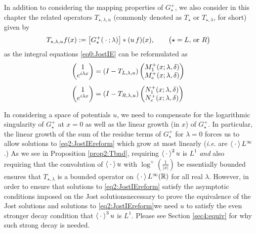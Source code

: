 \documentclass[../dissertation.tex]{subfiles}
\begin{document}
In addition to considering the mapping properties of $G_\star^+$, we also 
consider in this chapter the related operators $T_{\star, \lambda, u}$
(commonly denoted as $T_{\star}$ or $T_{\star, \lambda}$, for short) given by 
\begin{align}\label{eqn2:Tdefn}
	T_{\star, \lambda, u} f(x) 
		:= \big[ G_\star^+(\kern 0.5ex \cdot \kern 0.5ex; \lambda) \big] * (u\,f)(x),
			\qquad \big( \star = L \text{, or } R \big)
\end{align}
as the integral equations \eqref{eq0:JostIE} can be reformulated as
\begin{subequations}
	\label{eq2:JostIEreform}
	\begin{align}
		\label{eq2:JostIEleftReform}
		\begin{pmatrix}
			1 \\
			e^{i\lambda x} 
		\end{pmatrix}
			&= (I - T_{L, \lambda, u})
				\begin{pmatrix}
					M_1^+(x; \lambda, \delta) \\
					M_e^+(x; \lambda, \delta)
				\end{pmatrix} \\[0.3\baselineskip]
		\label{eq2:JostIErightReform}
		\begin{pmatrix}
			1 \\
			e^{i\lambda x} 
		\end{pmatrix}
			&= (I - T_{R, \lambda, u})
				\begin{pmatrix}
					N_1^+(x; \lambda, \delta) \\
					N_e^+(x; \lambda, \delta)
				\end{pmatrix} 
\end{align}
\end{subequations}

In considering a space of potentials $u$, we need to compensate 
for the logarithmic singularity of $G_\star^+$ at $x = 0$ as well as the linear
growth (in $x$) of $G_\star^+$. In particular, the linear growth of the sum of 
the residue terms of $G_\star^+$ for $\lambda = 0$ forces us to allow 
solutions to \eqref{eq2:JostIEreform} which grow at most linearly (\textit{i.e.}
are $\left\langle \kern 0.5ex \cdot \kern 0.5ex \right\rangle L^\infty$.) As we see in Proposition \ref{prop2:Tbnd}, requiring
$\left\langle \kern 0.5ex \cdot \kern 0.5ex \right\rangle^2 u$ is $L^1$ \textit{and} also requiring that the convolution
of $\left\langle \kern 0.5ex \cdot \kern 0.5ex \right\rangle u$ with $\log^+\left(\frac{1}{|x|}\right)$ be essentially bounded 
ensures that $T_{\star, \lambda}$ is a bounded operator on 
$\left\langle \kern 0.5ex \cdot \kern 0.5ex \right\rangle L^\infty(\mathbb R)$ for all real $\lambda$. However, in order
to ensure that solutions to \eqref{eq2:JostIEreform} satisfy the asymptotic 
conditions imposed on the Jost solutions\textemdash{}necessary to prove the 
equivalence of the Jost solutions and solutions to 
\eqref{eq2:JostIEreform}\textemdash{}we need $u$ to satisfy the even stronger
decay condition that $\left\langle \kern 0.5ex \cdot \kern 0.5ex \right\rangle^3 u$ is $L^1$. Please see Section 
\ref{sec4:equiv} for why such strong decay is needed.
\end{document}
